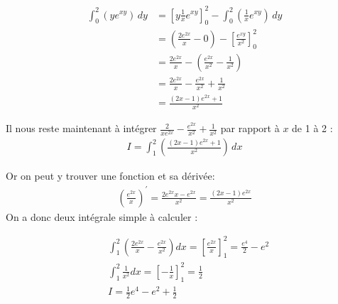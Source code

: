 \begin{solution}
\begin{enumerate}[label=(\alph*)]
        \[
        \begin{aligned}
            \int_0^2 (ye^{xy}) \, dy &= \left[ y \frac{1}{x} e^{xy} \right]_0^2 - \int_0^2 (\frac{1}{x} e^{xy}) \, dy\\
            &= (\frac{2e^{2x}}{x} - 0) - \left[ \frac{e^{xy}}{x^2}\right]_0^2 \\
            &= \frac{2e^{2x}}{x} - (\frac{e^{2x}}{x^2} - \frac{1}{x^2}) \\
            &= \frac{2e^{2x}}{x} - \frac{e^{2x}}{x^2} + \frac{1}{x^2} \\
            &=\frac{(2x -1) e^{2x} + 1}{x^2}
        \end{aligned}
        \]

        Il nous reste maintenant à intégrer \( \frac{2}{xe^{2x}} - \frac{e^{2x}}{x^2} + \frac{1}{x^2} \) par rapport à \( x \) de 1 à 2 :
        \[
        \begin{aligned}
            I = \int_1^2 (\frac{(2x -1) e^{2x} + 1}{x^2}) \, dx 
        \end{aligned}
        \]

        Or on peut y trouver une fonction et sa dérivée: 
        \[
        \begin{aligned}
            (\frac{e^{2x}}{x})^{'} = \frac{2 e^{2x} x - e^{2x}}{x^2}= \frac{(2x -1) e^{2x}}{x^2}
        \end{aligned}
        \]
        On a donc deux intégrale simple à calculer : 

        \[
        \begin{aligned}
           &\int_1^2 (\frac{2e^{2x}}{x} - \frac{e^{2x}}{x^2}) dx = \left[ \frac{e^{2x}}{x}\right]_1^2 = \frac{e^4}{2} - e^2 \\
           &\int_1^2 \frac{1}{x^2} dx = \left[ -\frac{1}{x}\right]_1^2 = \frac{1}{2} \\
           &I = \frac{1}{2}e^4 - e^2 + \frac{1}{2}        \end{aligned}
        \]
    \end{enumerate}
\end{solution}

\newpage

